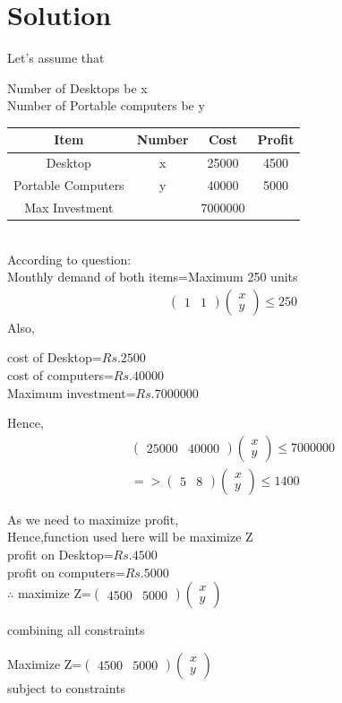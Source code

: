\documentclass[10pt, a4paper]{article}
\newcommand{\myvec}[1]{\ensuremath{\begin{pmatrix}#1\end{pmatrix}}}
\begin{document}
\section{Solution}
Let's assume that
\begin{center}
Number of Desktops be x\\
Number of Portable computers be y\\
\end{center}
\begin{tabular}{|c|c|c|c|}
	\hline
	\textbf{Item}&\textbf{Number}&\textbf{Cost}&\textbf{Profit}\\
	\hline
	Desktop&x&25000&4500\\
	\hline
	Portable Computers&y&40000&5000\\
	\hline
	Max Investment& &7000000&\\
	\hline
\end{tabular}\\
According to question:\\
Monthly demand of both items=Maximum 250 units\\
\begin{align}
\myvec{1&1}\myvec{x\\y} \le 250 
\end{align}
Also,\\
\begin{center}
	cost of Desktop=$Rs.2500$\\
	cost of computers=$Rs.40000$\\
	Maximum investment=$Rs.7000000$\\
\end{center}
Hence,
\begin{align}
 \myvec{25000&40000}\myvec{x\\y} \le 7000000 \\
=>\myvec{5&8}\myvec{x\\y} \le 1400 
\end{align}
\begin{center}
 As we need to maximize profit,\\
Hence,function used here will be maximize Z\\
	profit on Desktop=$Rs.4500$\\
	profit on computers=$Rs.5000$\\
	$\therefore$ maximize Z=$\myvec{4500&5000}\myvec{x\\y}$\\ 
\end{center}
combining all constraints
\begin{center}
	Maximize Z=$\myvec{4500&5000}\myvec{x\\y}$\\
	subject to constraints\\
\end{center}
\end{document}
